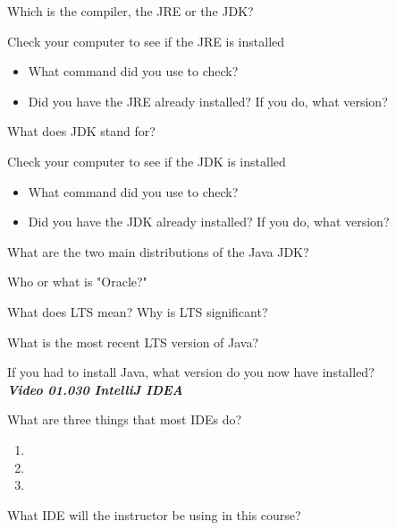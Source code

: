 \documentclass[letterpaper,11pt]{exam}
\newcommand{\videoheading}[1]{\Large\textbf{\textit{#1}}}
\begin{document}
\begin{questions}
\question Which is the compiler, the JRE or the JDK? \makebox[4em]{\hrulefill}

\begin{samepage}
\question Check your computer to see if the JRE is installed
\begin{itemize}
    \item What command did you use to check?
    \item Did you have the JRE already installed?  If you do, what version?
\end{itemize}
\end{samepage}

\question What does JDK stand for? 

\begin{samepage}
    \question Check your computer to see if the JDK is installed
    \begin{itemize}
        \item What command did you use to check?
        \item Did you have the JDK already installed?  If you do, what version?
    \end{itemize}
    \end{samepage}
    
 \question What are the two main distributions of the Java JDK?
 
 \question Who or what is "Oracle?"
 \vspace{1cm}

 \question What does LTS mean?  Why is LTS significant?
 \vspace{1.5cm}

 \question What is the most recent LTS version of Java?

 \question If you had to install Java, what version do you now have installed?
 \vspace{1cm}\\
 \videoheading{Video 01.030 IntelliJ IDEA}

\begin{samepage}
    \question What are three things that most IDEs do?
    
        \begin{enumerate}
         \item 
         \item 
         \item 
        \end{enumerate}
\end{samepage}

\question What IDE will the instructor be using in this course?


\end{questions}
\end{document}

